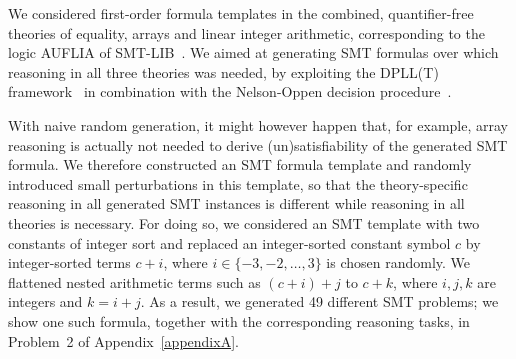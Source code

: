 We considered first-order formula templates in the combined,
quantifier-free 
theories of equality, arrays and linear integer arithmetic,
corresponding to the logic AUFLIA of
SMT-LIB~\cite{barrett2017smtlib}. We aimed at generating SMT formulas
over which reasoning in all three theories was needed, by exploiting
the DPLL(T) framework~\cite{Tinelli02} in combination with the
Nelson-Oppen decision procedure~\cite{Nelson79}.
%

With naive random generation, it might however happen
that, for example, array reasoning is actually not needed to derive
(un)satisfi\-ability of the generated SMT formula. We therefore constructed an
SMT formula template and randomly introduced small perturbations in this template,
so that the theory-specific reasoning in all generated SMT instances is
different while reasoning in all theories is necessary.
%
For doing so, we considered an SMT template with two constants of
integer sort and replaced an integer-sorted constant symbol $c$ by  integer-sorted terms $c+i$,
where $i \in \{-3,-2,\dots,3\}$ is chosen randomly. We flattened nested arithmetic terms such as $(c+i)+j$ to $c+k$,
where $i,j,k$ are integers and $k = i+j$. As a result, we
generated 49 different SMT problems; we show one such formula, together
with the corresponding reasoning tasks, in Problem~2 of Appendix~\ref{appendixA}.
